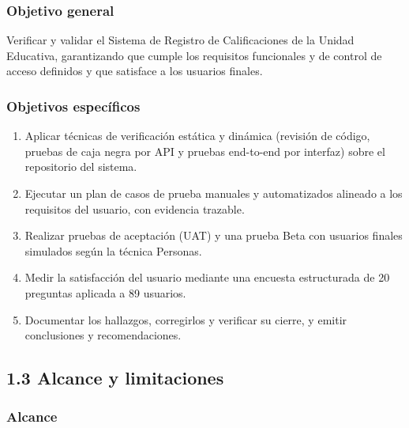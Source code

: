 \documentclass[11pt,a4paper]{article}
\begin{document}
\subsubsection*{Objetivo general}


Verificar y validar el Sistema de Registro de Calificaciones de la Unidad Educativa, garantizando que cumple los requisitos funcionales y de control de acceso definidos y que satisface a los usuarios finales.


\subsubsection*{Objetivos específicos}


\begin{enumerate}[leftmargin=*]
\item Aplicar técnicas de verificación estática y dinámica (revisión de código, pruebas de caja negra por API y pruebas end-to-end por interfaz) sobre el repositorio del sistema.
\item Ejecutar un plan de casos de prueba manuales y automatizados alineado a los requisitos del usuario, con evidencia trazable.
\item Realizar pruebas de aceptación (UAT) y una prueba Beta con usuarios finales simulados según la técnica Personas.
\item Medir la satisfacción del usuario mediante una encuesta estructurada de 20 preguntas aplicada a 89 usuarios.
\item Documentar los hallazgos, corregirlos y verificar su cierre, y emitir conclusiones y recomendaciones.
\end{enumerate}


\subsection*{1.3 Alcance y limitaciones}


\subsubsection*{Alcance}
\end{document}
